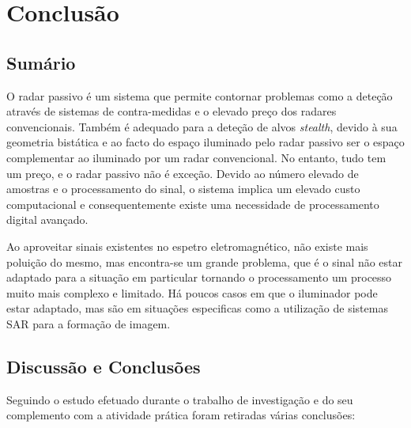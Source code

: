 
\chapter{Conclusão} %
\label{chap:Chapter6} %

\section{Sumário}
O radar passivo é um sistema que permite contornar problemas como a deteção através de sistemas de contra-medidas e o elevado preço dos radares convencionais. Também é adequado para a deteção de alvos \textit{stealth}, devido à sua geometria bistática e ao facto do espaço iluminado pelo radar passivo ser o espaço complementar ao iluminado por um radar convencional. No entanto, tudo tem um preço, e o radar passivo não é exceção. Devido ao número elevado de amostras e o processamento do sinal, o sistema implica um elevado custo computacional e consequentemente existe uma necessidade de processamento digital avançado. \par 
Ao aproveitar sinais existentes no espetro eletromagnético, não existe mais poluição do mesmo, mas encontra-se um grande problema, que é o sinal não estar adaptado para a situação em particular tornando o processamento um processo muito mais complexo e limitado. Há poucos casos em que o iluminador pode estar adaptado, mas são em situações especificas como a utilização de sistemas \gls{SAR} para a formação de imagem.\par 


\section{Discussão e Conclusões}
Seguindo o estudo efetuado durante o trabalho de investigação e do seu complemento com a atividade prática foram retiradas várias conclusões:


